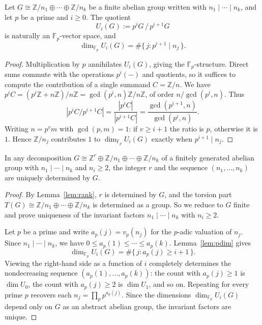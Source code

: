 \begin{lemma}
    \label{lem:pdim}
    Let $G \cong \mathbb{Z}/n_1 \oplus \cdots \oplus \mathbb{Z}/n_k$ be a finite abelian
    group written with $n_1 \mid \cdots \mid n_k$, and let $p$ be a prime and
    $i \ge 0$. The quotient
    \[
        U_i(G) := p^i G \,/\, p^{i+1} G
    \]
    is naturally an $\mathbb{F}_p$-vector space, and
    \[
        \dim_{\mathbb{F}_p} U_i(G) = \#\{\, j : p^{i+1} \mid n_j \,\}.
    \]
\end{lemma}
\begin{proof}
    Multiplication by $p$ annihilates $U_i(G)$, giving the $\mathbb{F}_p$-structure.
    Direct sums commute with the operations $p^i(-)$ and quotients, so it
    suffices to compute the contribution of a single summand $C = \mathbb{Z}/n$.
    We have $p^i C = (p^i \mathbb{Z} + n\mathbb{Z})/n\mathbb{Z} = \gcd(p^i, n)\mathbb{Z}/n\mathbb{Z}$, of order
    $n / \gcd(p^i, n)$. Thus
    \[
        |p^i C / p^{i+1} C| = \frac{|p^i C|}{|p^{i+1} C|}
        = \frac{\gcd(p^{i+1}, n)}{\gcd(p^i, n)}.
    \]
    Writing $n = p^v m$ with $\gcd(p, m) = 1$: if $v \ge i + 1$ the ratio is
    $p$, otherwise it is $1$. Hence $\mathbb{Z}/n_j$ contributes $1$ to
    $\dim_{\mathbb{F}_p} U_i(G)$ exactly when $p^{i+1} \mid n_j$.
\end{proof}

\begin{proposition}
    \label{prop:uniqueness}
    In any decomposition
    $G \cong \mathbb{Z}^r \oplus \mathbb{Z}/n_1 \oplus \cdots \oplus \mathbb{Z}/n_k$ of a
    finitely generated abelian group with $n_1 \mid \cdots \mid n_k$ and
    $n_i \ge 2$, the integer $r$ and the sequence $(n_1, \dots, n_k)$ are
    uniquely determined by $G$.
\end{proposition}
\begin{proof}
    By Lemma~\ref{lem:rank}, $r$ is determined by $G$, and the torsion part
    $T(G) \cong \mathbb{Z}/n_1 \oplus \cdots \oplus \mathbb{Z}/n_k$ is determined as a
    group. So we reduce to $G$ finite and prove uniqueness of the invariant
    factors $n_1 \mid \cdots \mid n_k$ with $n_i \ge 2$.

    Let $p$ be a prime and write $a_p(j) = v_p(n_j)$ for the $p$-adic
    valuation of $n_j$. Since $n_1 \mid \cdots \mid n_k$, we have
    $0 \le a_p(1) \le \cdots \le a_p(k)$. Lemma~\ref{lem:pdim} gives
    \[
        \dim_{\mathbb{F}_p} U_i(G) = \#\{\, j : a_p(j) \ge i + 1 \,\}.
    \]
    Viewing the right-hand side as a function of $i$ completely determines the
    nondecreasing sequence $(a_p(1), \dots, a_p(k))$: the count with
    $a_p(j) \ge 1$ is $\dim U_0$, the count with $a_p(j) \ge 2$ is
    $\dim U_1$, and so on. Repeating for every prime $p$ recovers each
    $n_j = \prod_p p^{a_p(j)}$. Since the dimensions $\dim_{\mathbb{F}_p} U_i(G)$
    depend only on $G$ as an abstract abelian group, the invariant factors
    are unique.
\end{proof}

